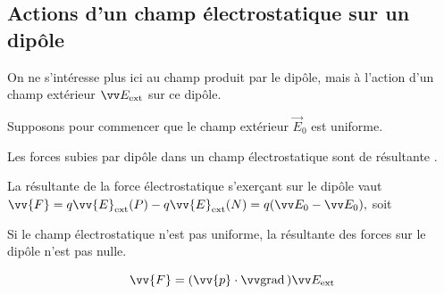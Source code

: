 \documentclass[12pt,fancy]{cours}
\begin{document}
\subsection{Actions d'un champ électrostatique sur un dipôle}

\begin{danger}
  On ne s'intéresse plus ici au champ produit par le dipôle, mais à l'action d'un champ extérieur $\Vec{E}_{\rm ext}$ sur ce dipôle.
\end{danger}
\label{subsec:résultante}
Supposons pour commencer que le champ extérieur $\Vec{E}_0$ est uniforme.
\begin{prop}\label{prop:}
  Les forces subies par dipôle dans un champ électrostatique  sont de résultante  .
\end{prop}
\begin{demo}
La résultante de la force électrostatique s’exerçant sur le dipôle  vaut
$
\vv{F}=q\vv{E}_{\rm ext}(P)-q\vv{E}_{\rm ext}(N)=q(\Vec{E}_0-\Vec{E}_0),
$
soit 
\end{demo}
Si le champ électrostatique n'est pas uniforme, la résultante des forces sur le dipôle n'est pas nulle.

\begin{theorem}\label{form:Fdip}
\begin{equation*}
\vv{F}=(\vv{p}\cdot\grad{})\Eext
\end{equation*}
\end{theorem}
\end{document}
